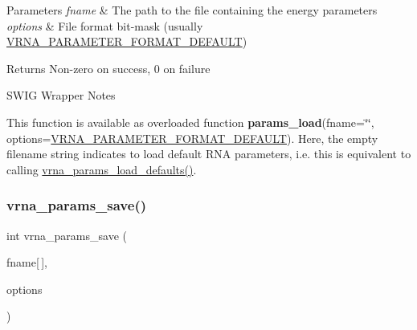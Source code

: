 \begin{DoxyParams}{Parameters}
{\em fname} & The path to the file containing the energy parameters \\
\hline
{\em options} & File format bit-\/mask (usually \mbox{\hyperlink{group__energy__parameters__rw_ga2d46720ac5bf0e56ce0dbbff459667d2}{V\+R\+N\+A\+\_\+\+P\+A\+R\+A\+M\+E\+T\+E\+R\+\_\+\+F\+O\+R\+M\+A\+T\+\_\+\+D\+E\+F\+A\+U\+LT}}) \\
\hline
\end{DoxyParams}
\begin{DoxyReturn}{Returns}
Non-\/zero on success, 0 on failure
\end{DoxyReturn}
\begin{DoxyRefDesc}{S\+W\+I\+G Wrapper Notes}
\item[\mbox{\hyperlink{wrappers__wrappers000098}{S\+W\+I\+G Wrapper Notes}}]This function is available as overloaded function {\bfseries{params\+\_\+load}}(fname=\char`\"{}\char`\"{}, options=\mbox{\hyperlink{group__energy__parameters__rw_ga2d46720ac5bf0e56ce0dbbff459667d2}{V\+R\+N\+A\+\_\+\+P\+A\+R\+A\+M\+E\+T\+E\+R\+\_\+\+F\+O\+R\+M\+A\+T\+\_\+\+D\+E\+F\+A\+U\+LT}}). Here, the empty filename string indicates to load default R\+NA parameters, i.\+e. this is equivalent to calling \mbox{\hyperlink{group__energy__parameters__rw_ga413bc688695c9a707dbcc678412d6792}{vrna\+\_\+params\+\_\+load\+\_\+defaults()}}. \end{DoxyRefDesc}
\mbox{\label{group__energy__parameters__rw_ga0de3731b3e4017c52bd678549f6c4ae5}} 
\subsubsection{\texorpdfstring{vrna\_params\_save()}{vrna\_params\_save()}}
{\footnotesize\ttfamily int vrna\+\_\+params\+\_\+save (\begin{DoxyParamCaption}\item[{const char}]{fname\mbox{[}$\,$\mbox{]},  }\item[{unsigned int}]{options }\end{DoxyParamCaption})}



